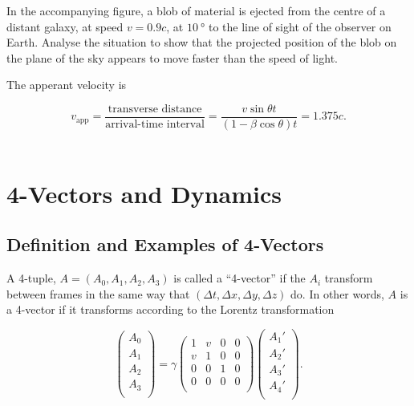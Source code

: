 \documentclass[english,a4paper,12pt]{report}
\begin{document}
{ In the accompanying figure, a blob of material is ejected from the centre of
a distant galaxy, at speed \(v = 0.9c\), at \(\SI{10}{\degree} \) to the line of sight of the observer
on Earth. Analyse the situation to show that the projected position of the blob on the
plane of the sky appears to move faster than the speed of light.}
{The apperant velocity is 

\begin{equation}
    v_{\text{app} } = \frac{\text{transverse distance} }{\text{arrival-time interval} } = \frac{v \sin \theta t}{(1-\beta \cos \theta )t} = 1.375c.   
\end{equation}
~
} 

















\chapter{4-Vectors and Dynamics}

\section{Definition and Examples of 4-Vectors}

\begin{definition}
A 4-tuple, \(A = (A_0 , A_1 , A_2 , A_3 )\) is called a ``4-vector'' if the \(A_{i} \) transform between frames in the same way that \((\Delta t, \Delta x, \Delta y, \Delta z)\) do. In other words, \(A\) is a 4-vector if it transforms according to the Lorentz transformation

\begin{equation}
    \begin{pmatrix}
         A_0  \\
         A_1  \\
         A_2  \\
         A_3  \\
    \end{pmatrix} = \gamma \begin{pmatrix}
        1  & v & 0 & 0  \\
        v & 1 & 0 & 0  \\
        0 & 0 & 1 & 0  \\
        0 & 0 & 0 & 0  \\
    \end{pmatrix} \begin{pmatrix}
         A_1 ' \\
         A_2 ' \\
         A_3 ' \\
         A_4 ' \\
    \end{pmatrix}.
\end{equation}
\end{definition}
\end{document}
